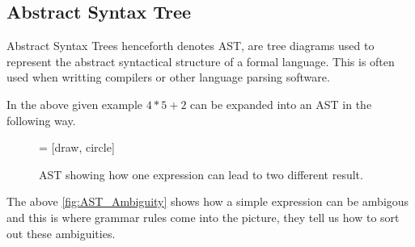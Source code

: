 \subsection{Abstract Syntax Tree}

Abstract Syntax Trees henceforth denotes AST, are tree diagrams used to represent
the abstract syntactical structure of a formal language. This is often used when 
writting compilers or other language parsing software.

In the above given example $ 4 * 5 + 2 $ can be expanded into an AST in the following
way.

\begin{figure}[h]
  \centering

   = [draw, circle]
  \caption{AST showing how one expression can lead to two different result.}%
  \label{fig:AST_Ambiguity}
\end{figure}

The above \autoref{fig:AST_Ambiguity} shows how a simple expression can be ambigous
and this is where grammar rules come into the picture, they tell us how to sort out 
these ambiguities. 
